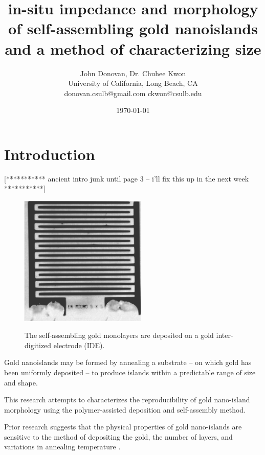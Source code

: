 \documentclass[12pt,oneside,english]{article}
\begin{document}

        \title{in-situ impedance and morphology of self-assembling gold nanoislands and a method of characterizing size}

	\author{John Donovan, Dr. Chuhee Kwon\\
	University of California, Long Beach, CA\\
	{\small donovan.csulb@gmail.com ckwon@csulb.edu}}
	
        \date{\today}

	\maketitle

	\tableofcontents
	\clearpage

        \section{Introduction}

[*********** ancient intro junk until page 3 -- i'll fix this up in the next week ***********]

	\begin{figure}
	\includegraphics[width=60mm]{images/IDE.eps} \label{f:IDE}
	\caption{The self-assembling gold monolayers are deposited on a gold inter-digitized electrode (IDE).}
	\end{figure}
	
	Gold nanoislands may be formed by annealing a substrate -- on which gold has been uniformly deposited -- to produce islands within a predictable range of size and shape.
	
	This research attempts to characterizes the reproducibility of gold nano-island morphology using the polymer-assisted deposition and self-assembly method.
	
	Prior research suggests that the physical properties of gold nano-islands are sensitive to the method of depositing the gold, the number of layers, and variations in annealing temperature \cite{shon11}.
\end{document}
